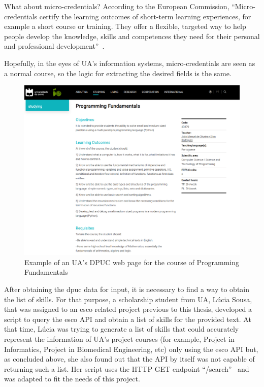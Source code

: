 What about micro-credentials? According to the European Commission, “Micro-credentials certify the learning outcomes of short-term learning experiences, for example a short course or training. They offer a flexible, targeted way to help people develop the knowledge, skills and competences they need for their personal and professional development”~\cite{microcredentials}.

Hopefully, in the eyes of UA's information systems, micro-credentials are seen as a normal course, so the logic for extracting the desired fields is the same.

\begin{figure}[H]
   \centering
   \includegraphics[width=15cm]{figs/dpuc_fp.png}
   \caption{Example of an UA's DPUC web page for the course of Programming Fundamentals~\cite{dpuc}}
   \label{fig:dpuc}
\end{figure}

After obtaining the \ac{dpuc} data for input, it is necessary to find a way to obtain the list of skills. For that purpose, a scholarship student from UA, Lúcia Sousa, that was assigned to an \ac{esco} related project previous to this thesis, developed a script to query the \ac{esco} API and obtain a list of skills for the provided text. At that time, Lúcia was trying to generate a list of skills that could accurately represent the information of UA’s project courses (for example, Project in Informatics, Project in Biomedical Engineering, etc) only using the \ac{esco} API but, as concluded above, she also found out that the API by itself was not capable of returning such a list. Her script uses the HTTP GET endpoint “/search”~\cite{esco_api_doc} and was adapted to fit the needs of this project.

